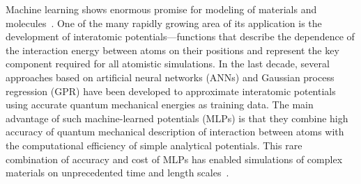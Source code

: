 \documentclass[aip,jcp,reprint,amsmath,amssymb,nature]{revtex4-1}
\begin{document}


Machine learning shows enormous promise for modeling of materials and molecules~\cite{ceriotti-science}. 
One of the many rapidly growing area of its application is the development of interatomic potentials---functions that describe the dependence of the interaction energy between atoms on their positions and represent the key component required for all atomistic simulations. 
In the last decade, several approaches based on artificial neural networks (ANNs) and Gaussian process regression (GPR) have been 
developed to approximate interatomic potentials using accurate quantum mechanical energies as training data. 
The main advantage of such machine-learned potentials (MLPs) is that they combine high accuracy of quantum mechanical description of interaction between atoms with the computational efficiency of simple analytical potentials. 
This rare combination of accuracy and cost of MLPs has enabled simulations of complex materials on unprecedented time and length scales~\cite{Khaliullin2010,Khaliullin2011,RZK0}. 
\end{document}

